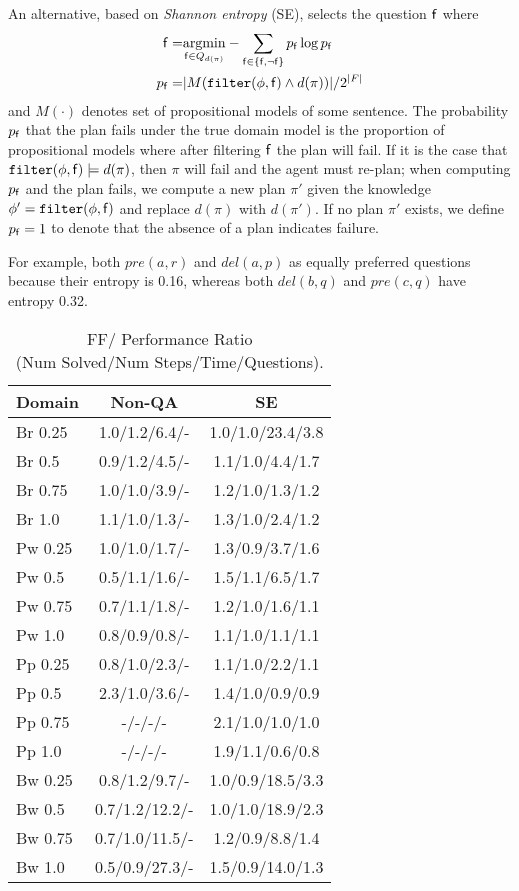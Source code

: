 \documentclass{article}
\begin{document}
An alternative, based on  {\em Shannon entropy} (SE),
selects the question ${\sf f}$ where
\begin{align}
{\sf f} = &\underset{{\sf f}  \in Q_{d(\pi)}}{\operatorname{argmin}} -
\sum\limits_{{\sf f} \in \{{\sf f}, \neg {\sf f}\}} p_{\sf f} \log p_{\sf f} 
\notag\\
 p_{\sf f} =& |M({\tt filter}(\phi, {\sf f}) \wedge 
d(\pi))|/2^{|F|}\notag
\end{align}
and $M(\cdot)$ denotes set of propositional models of some sentence.
The probability $p_{\sf f}$ that the plan fails under the true domain model
is the proportion of propositional models where after filtering ${\sf f}$ the
plan will fail.  If it is the case that ${\tt filter}(\phi, {\sf f}) \models 
d(\pi)$, then $\pi$ will  fail and the agent must re-plan; when computing
$p_{\sf f}$ and the plan fails, we compute a new plan $\pi'$ given the knowledge
$\phi' = {\tt filter}(\phi, {\sf f})$ and replace $d(\pi)$ with $d(\pi')$.  If
no plan $\pi'$ exists, we define $p_{\sf f} = 1$ to denote that the absence of
a plan indicates failure. 

For example, both $pre(a, r)$ and $del(a,
p)$ as equally preferred questions because their entropy is 0.16, whereas both
$del(b, q)$ and $pre(c, q)$ have entropy 0.32.


\begin{table}\small\centering\begin{tabular}{|l|cc|}\hline
Domain & Non-QA  & SE \\ \hline
Br	0.25	 & 1.0/1.2/6.4/-	 & 1.0/1.0/23.4/3.8 	\\ \hline
Br	0.5	 & 0.9/1.2/4.5/-	 & 1.1/1.0/4.4/1.7 	\\ \hline
Br	0.75	 & 1.0/1.0/3.9/-	 & 1.2/1.0/1.3/1.2 	\\ \hline
Br	1.0	 & 1.1/1.0/1.3/-	 & 1.3/1.0/2.4/1.2 	\\ \hline
\hline
Pw	0.25	 & 1.0/1.0/1.7/-	 & 1.3/0.9/3.7/1.6 	\\ \hline
Pw	0.5	 & 0.5/1.1/1.6/-	 & 1.5/1.1/6.5/1.7 	\\ \hline
Pw	0.75	 & 0.7/1.1/1.8/-	 & 1.2/1.0/1.6/1.1 	\\ \hline
Pw	1.0	 & 0.8/0.9/0.8/-	 & 1.1/1.0/1.1/1.1 	\\ \hline
\hline
Pp	0.25	 & 0.8/1.0/2.3/-	 & 1.1/1.0/2.2/1.1 	\\ \hline
Pp	0.5	 & 2.3/1.0/3.6/-	 & 1.4/1.0/0.9/0.9 	\\ \hline
Pp	0.75	 & -/-/-/- 	 & 2.1/1.0/1.0/1.0 	\\ \hline
Pp	1.0	 & -/-/-/- 	 & 1.9/1.1/0.6/0.8 	\\ \hline
\hline
Bw	0.25	 & 0.8/1.2/9.7/- 	 & 1.0/0.9/18.5/3.3 	\\ \hline
Bw	0.5	 & 0.7/1.2/12.2/-	 & 1.0/1.0/18.9/2.3 	\\ \hline
Bw	0.75	 & 0.7/1.0/11.5/-	 & 1.2/0.9/8.8/1.4 	\\ \hline
Bw	1.0	 & 0.5/0.9/27.3/-	 & 1.5/0.9/14.0/1.3 	\\ \hline
\end{tabular}\caption{\label{tab:plannerComp} FF/
 Performance Ratio \\(Num Solved/Num Steps/Time/Questions).}\end{table}
\end{document}
